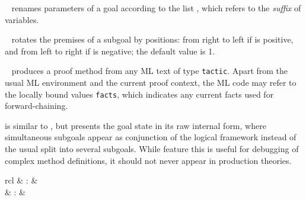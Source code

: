 \begin{isabellebody}
\begin{isamarkuptext}
\begin{description}
  \item \hyperlink{method.rename-tac}{\mbox{}}~ renames parameters of a
  goal according to the list , which refers to the
  \emph{suffix} of variables.

  \item \hyperlink{method.rotate-tac}{\mbox{}}~ rotates the premises of a
  subgoal by  positions: from right to left if  is
  positive, and from left to right if  is negative; the
  default value is 1.

  \item \hyperlink{method.tactic}{\mbox{}}~ produces a proof method from
  any ML text of type \verb|tactic|.  Apart from the usual ML
  environment and the current proof context, the ML code may refer to
  the locally bound values \verb|facts|, which indicates any
  current facts used for forward-chaining.

  \item \hyperlink{method.raw-tactic}{\mbox{}} is similar to \hyperlink{method.tactic}{\mbox{}}, but
  presents the goal state in its raw internal form, where simultaneous
  subgoals appear as conjunction of the logical framework instead of
  the usual split into several subgoals.  While feature this is useful
  for debugging of complex method definitions, it should not never
  appear in production theories.

  \end{description}%
\end{isamarkuptext}%
\isamarkuptrue%
%
\isamarkuptrue%
%
\isamarkuptrue%
%
\begin{isamarkuptext}%
\begin{matharray}{rcl}
    \hypertarget{method.simp}{\hyperlink{method.simp}{\mbox{}}} & : &  \\
    \hypertarget{method.simp-all}{\hyperlink{method.simp-all}{\mbox{}}} & : &  \\
  \end{matharray}


\end{isamarkuptext}
\end{isabellebody}
